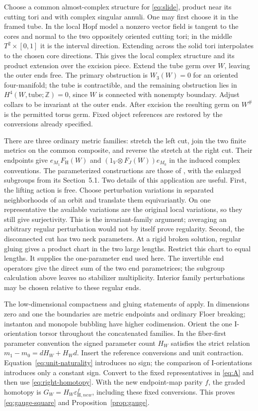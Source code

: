 \documentclass[11pt]{amsart}
\theoremstyle{definition}
\theoremstyle{remark}
\theoremstyle{plain}
\newcommand{\ZZ}{\mathbb Z}
\newcommand{\eps}{\varepsilon}
\newcommand{\FH}{F_{\mathrm H}}
\begin{document}
Choose a common almost-complex structure for \eqref{eq:slide},
product near its cutting tori and with complex singular annuli.
One may first choose it in the framed tube. In the local Hopf
model a nonzero vector field is tangent to the cores and normal
to the two oppositely oriented cutting tori; in the middle
$T^2\times[0,1]$ it is the interval direction. Extending across
the solid tori interpolates to the chosen core directions. This
gives the local complex structure and its product extension over
the excision piece. Extend the tube germ over $W$, leaving the
outer ends free. The primary obstruction is $W_3(W)=0$ for an
oriented four-manifold; the tube is contractible, and the remaining
obstruction lies in $H^4(W,\mathrm{tube};\ZZ)=0$, since $W$ is
connected with nonempty boundary. Adjust collars to be invariant
at the outer ends. After excision the resulting germ on $W^\#$
is the permitted torus germ. Fixed object references are restored
by the conversions already specified.

There are three ordinary metric families: stretch the left cut,
join the two finite metrics on the common composite, and reverse
the stretch at the right cut. Their endpoints give
$e_{M_1}\FH(W)$ and $(1_V\otimes F_J(W))e_{M_0}$ in the induced
complex conventions. The parameterized constructions are those of
\cite[Section~3.9, following Proposition~3.10]{KM}, with the enlarged
subgroups from its Section~5.1. Two details of this application
are useful. First, the lifting action is free. Choose perturbation
variations in separated neighborhoods of an orbit and translate
them equivariantly. On one representative the available variations
are the original local variations, so they still give surjectivity.
This is the invariant-family argument; averaging an arbitrary
regular perturbation would not by itself prove regularity.
Second, the disconnected cut has two neck parameters. At a rigid
broken solution, regular gluing gives a product chart in the two
large lengths. Restrict this chart to equal lengths. It supplies
the one-parameter end used here. The invertible end operators give
the direct sum of the two end parametrices; the subgroup calculation
above leaves no stabilizer multiplicity. Interior family
perturbations may be chosen relative to these regular ends.

The low-dimensional compactness and gluing statements of
\cite[Sections~3.8--3.9 and~5.1]{KM} apply. In dimensions zero
and one the boundaries are metric endpoints and ordinary Floer
breaking; instanton and monopole bubbling have higher codimension.
Orient the one I-orientation torsor throughout the concatenated
families. In the fiber-first parameter convention the signed
parameter count $H_W$ satisfies the strict relation
$m_1-m_0=dH_W+H_Wd$. Insert the reference conversions and unit
contraction. Equation~\eqref{eq:unit-naturality} introduces no sign;
the comparison of I-orientations introduces only a constant sign. Convert to the
fixed representatives in \eqref{eq:A} and then use
\eqref{eq:right-homotopy}. With the new endpoint-map parity $f$, the
graded homotopy is $G_W=H_W\eps_{\mathrm H,new}^{f}$, including
these fixed conversions. This proves \eqref{eq:gauge-square} and
Proposition~\ref{prop:gauge}.
\end{document}

